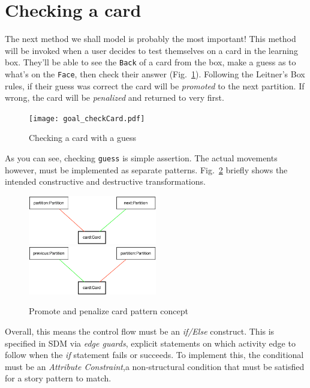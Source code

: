 \newpage
\section{Checking a card}
\genHeader
\hypertarget{sec:checkCard}{}

The next method we shall model is probably the most important! This method will be invoked when a user decides to test themselves on a card in the
learning box. They'll be able to see the \texttt{Back} of a card from the box, make a guess as to what's on the \texttt{Face}, then check their
answer (Fig.~\ref{fig:goal_check}). Following the Leitner's Box rules, if their guess was correct the card will be \emph{promoted} to the next
partition. If wrong, the card will be \emph{penalized} and returned to very first.

\begin{figure}[htbp]
 	\centering
   \texttt{[image: goal\_checkCard.pdf]}
 	\caption{Checking a card with a guess}
 	\label{fig:goal_check}
\end{figure}
\FloatBarrier

As you can see, checking \texttt{guess} is simple assertion. The actual movements however, must be implemented as separate patterns.
Fig.~\ref{fig:patterns_check} briefly shows the intended constructive and destructive transformations.

\begin{figure}[htbp]
 	\centering
   \includegraphics[width=0.5\textwidth]{checkCard_promote.pdf}
   \\ \vspace{1cm}
    \includegraphics[width=0.5\textwidth]{checkCard_penalize.pdf}
 	\caption{Promote and penalize card pattern concept}
 	\label{fig:patterns_check}
\end{figure}
\FloatBarrier

Overall, this means the control flow must be an \emph{if/Else} construct. This is specified in SDM via \emph{edge guards}, explicit
statements on which activity edge to follow when the \emph{if} statement fails or succeeds. To implement this, the conditional must be an \emph{Attribute
Constraint},a non-structural condition that must be satisfied for a story pattern to match. 





